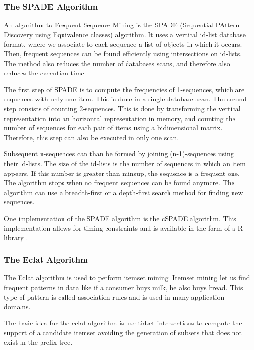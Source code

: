 \subsubsection{The SPADE Algorithm}
\label{sec:the_spade_algorithm}
An algorithm to Frequent Sequence Mining is the SPADE\cite{zaki2001spade} (Sequential PAttern Discovery using Equivalence classes) algorithm. It uses a vertical id-list database format, where we associate to each sequence a list of objects in which it occurs. Then, frequent sequences can be found efficiently using intersections on id-lists. The method also reduces the number of databases scans, and therefore also reduces the execution time.

The first step of SPADE is to compute the frequencies of 1-sequences, which are sequences with only one item. This is done in a single database scan. The second step consists of counting 2-sequences. This is done by transforming the vertical representation into an horizontal representation in memory, and counting the number of sequences for each pair of items using a bidimensional matrix. Therefore, this step can also be executed in only one scan.

Subsequent n-sequences can than be formed by joining (n-1)-sequences using their id-lists. The size of the id-lists is the number of sequences in which an item appears. If this number is greater than minsup, the sequence is a frequent one. The algorithm stops when no frequent sequences can be found anymore. The algorithm can use a breadth-first or a depth-first search method for finding new sequences.

One implementation of the SPADE algorithm is the cSPADE algorithm. This implementation allows for timing constraints and is available in the form of a R library \cite{zaki2000cspade}.


\subsubsection{The Eclat Algorithm}
The Eclat algorithm \cite{zaki1997new} is used to perform itemset mining. Itemset mining let us find frequent patterns in data like if a consumer buys milk, he also buys bread. This type of pattern is called association rules and is used in many application domains.

The basic idea for the eclat algorithm is use tidset intersections to compute the support of a candidate itemset avoiding the generation of subsets that does not exist in the prefix tree.

